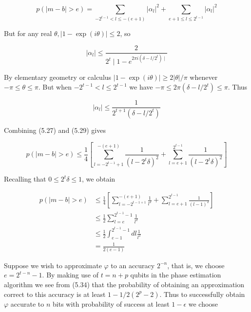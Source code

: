 \begin{equation}
    p(|m-b|>e)=\sum_{-2^{t-1}<l \leq-(e+1)}\left|\alpha_{l}\right|^{2}+\sum_{e+1 \leq l \leq 2^{t-1}}\left|\alpha_{l}\right|^{2} \tag{5.27}
\end{equation}

But for any real $\theta,|1-\exp (i \theta)| \leq 2$, so

\begin{equation}
    \left|\alpha_{l}\right| \leq \frac{2}{2^{t} \mid 1-e^{2 \pi i\left(\delta-l / 2^{t}\right) \mid}} \tag{5.28}
\end{equation}

By elementary geometry or calculus $|1-\exp (i \theta)| \geq 2|\theta| / \pi$ whenever $-\pi \leq \theta \leq \pi$. But when $-2^{t-1}<l \leq 2^{t-1}$ we have $-\pi \leq 2 \pi\left(\delta-l / 2^{t}\right) \leq \pi$. Thus

\begin{equation}
    \left|\alpha_{l}\right| \leq \frac{1}{2^{t+1}\left(\delta-l / 2^{t}\right)} \tag{5.29}
\end{equation}

Combining (5.27) and (5.29) gives

\begin{equation}
    p(|m-b|>e) \leq \frac{1}{4}\left[\sum_{l=-2^{t-1}+1}^{-(e+1)} \frac{1}{\left(l-2^{t} \delta\right)^{2}}+\sum_{l=e+1}^{2^{t-1}} \frac{1}{\left(l-2^{t} \delta\right)^{2}}\right] \tag{5.30}
\end{equation}

Recalling that $0 \leq 2^{t} \delta \leq 1$, we obtain

\begin{align}
p(|m-b|>e) & \leq \frac{1}{4}\left[\sum_{l=-2^{t-1+1}}^{-(e+1)} \frac{1}{l^{2}}+\sum_{l=e+1}^{2^{t-1}} \frac{1}{(l-1)^{2}}\right]  \tag{5.31}\\
& \leq \frac{1}{2} \sum_{l=e}^{2^{t-1}-1} \frac{1}{l^{2}}  \tag{5.32}\\
& \leq \frac{1}{2} \int_{e-1}^{2^{t-1}-1} d l \frac{1}{l^{2}}  \tag{5.33}\\
& =\frac{1}{2(e-1)} \tag{5.34}
\end{align} 

Suppose we wish to approximate $\varphi$ to an accuracy $2^{-n}$, that is, we choose $e=2^{t-n}-1$. By making use of $t=n+p$ qubits in the phase estimation algorithm we see from (5.34) that the probability of obtaining an approximation correct to this accuracy is at least $1-1 / 2\left(2^{p}-2\right)$. Thus to successfully obtain $\varphi$ accurate to $n$ bits with probability of success at least $1-\epsilon$ we choose

